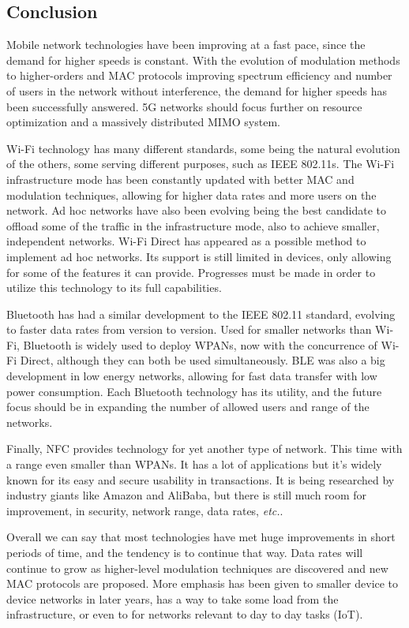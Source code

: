 \subsection{Conclusion}

Mobile network technologies have been improving at a fast pace, since the demand for higher speeds is constant. With the evolution of modulation methods to higher-orders and \gls{MAC} protocols improving spectrum efficiency and number of users in the network without interference, the demand for higher speeds has been successfully answered. 5G networks should focus further on resource optimization and a massively distributed \gls{MIMO} system.

Wi-Fi technology has many different standards, some being the natural evolution of the others, some serving different purposes, such as IEEE 802.11s. The Wi-Fi infrastructure mode has been constantly updated with better \gls{MAC} and modulation techniques, allowing for higher data rates and more users on the network. Ad hoc networks have also been evolving being the best candidate to offload some of the traffic in the infrastructure mode, also to achieve smaller, independent networks. Wi-Fi Direct has appeared as a possible method to implement ad hoc networks. Its support is still limited in devices, only allowing for some of the features it can provide. Progresses must be made in order to utilize this technology to its full capabilities.

Bluetooth has had a similar development to the IEEE 802.11 standard, evolving to faster data rates from version to version. Used for smaller networks than Wi-Fi, Bluetooth is widely used to deploy \glspl{WPAN}, now with the concurrence of Wi-Fi Direct, although they can both be used simultaneously. \gls{BLE} was also a big development in low energy networks, allowing for fast data transfer with low power consumption. Each Bluetooth technology has its utility, and the future focus should be in expanding the number of allowed users and range of the networks.

Finally, \gls{NFC} provides technology for yet another type of network. This time with a range even smaller than \glspl{WPAN}. It has a lot of applications but it's widely known for its easy and secure usability in transactions. It is being researched by industry giants like Amazon and AliBaba, but there is still much room for improvement, in security, network range, data rates, \textit{etc.}.

Overall we can say that most technologies have met huge improvements in short periods of time, and the tendency is to continue that way. Data rates will continue to grow as higher-level modulation techniques are discovered and new \gls{MAC} protocols are proposed. More emphasis has been given to smaller device to device networks in later years, has a way to take some load from the infrastructure, or even to for networks relevant to day to day tasks (\gls{IoT}).







